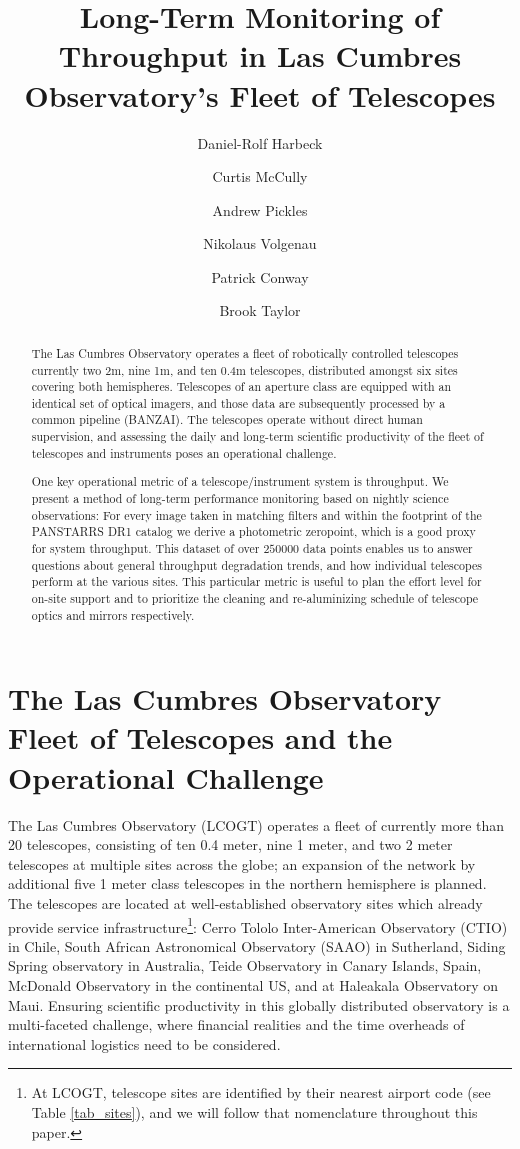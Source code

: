 \documentclass[]{spie}
\title{Long-Term Monitoring of Throughput in Las Cumbres Observatory's Fleet of Telescopes}
\author[a]{Daniel-Rolf Harbeck}
\author[a]{Curtis McCully}
\author[a]{Andrew Pickles}
\author[a]{Nikolaus Volgenau}
\author[a]{Patrick Conway}
\author[a]{Brook Taylor}
\affil[a] {Las Cumbres Observatory, Goleta, CA (USA)}
\begin{document}
\maketitle

\begin{abstract}
The Las Cumbres Observatory operates a fleet of robotically controlled telescopes currently two 2m,
nine 1m, and ten 0.4m telescopes, distributed amongst six sites covering both hemispheres.
Telescopes of an aperture class are equipped with an identical set of optical imagers, and those
data are subsequently processed by a common pipeline (BANZAI). The telescopes operate without direct
human supervision, and assessing the daily and long-term scientific productivity of the fleet of
telescopes and instruments poses an operational challenge.

One key operational metric of a telescope/instrument system is throughput. We present a method of
long-term performance monitoring based on nightly science observations: For every image taken in
matching filters and within the footprint of the PANSTARRS DR1 catalog we derive a photometric
zeropoint, which is a good proxy for system throughput. This dataset of over $250000$ data points
enables us to answer questions about general throughput degradation trends, and how individual
telescopes perform at the various sites. This particular metric is useful to plan the effort level
for on-site support and to prioritize the cleaning and re-aluminizing schedule of telescope optics
and mirrors respectively.
\end{abstract}




\section{The Las Cumbres Observatory Fleet of Telescopes and the Operational Challenge}

The Las Cumbres Observatory (LCOGT) operates a fleet of currently more than 20 telescopes,
consisting of ten 0.4 meter, nine 1 meter, and two 2 meter telescopes at multiple sites across the
globe\cite{brown2013}; an expansion of the network by additional five 1 meter class telescopes in
the northern hemisphere is planned. The telescopes are located at well-established observatory sites
which already provide service infrastructure\footnote{At LCOGT, telescope sites are identified by
    their nearest airport code (see Table \ref{tab_sites}), and we will follow that nomenclature    
    throughout this paper.}: Cerro Tololo Inter-American Observatory (CTIO) in Chile, South 
    African
Astronomical Observatory (SAAO) in Sutherland, Siding Spring observatory in Australia, Teide
Observatory in Canary Islands, Spain, McDonald Observatory in the continental US, and at Haleakala
Observatory on
Maui. Ensuring scientific productivity in this globally distributed observatory is a multi-faceted
challenge, where financial realities and the time overheads of international logistics need to be
considered.
\end{document}
